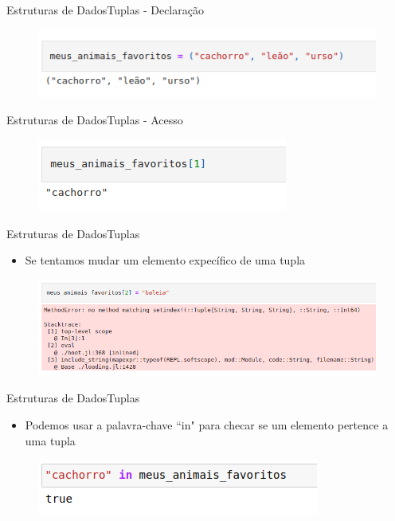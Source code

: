 \documentclass{beamer}
\begin{document}
\begin{frame}{Estruturas de Dados}{Tuplas - Declaração}
    \begin{figure}
        \centering
        \includegraphics[scale=0.5]{imagens/tuplas01.png}
        \label{fig:my_label}
    \end{figure}    
\end{frame}

\begin{frame}{Estruturas de Dados}{Tuplas - Acesso}
    \begin{figure}
        \centering
        \includegraphics[scale=0.5]{imagens/tuplas02.png}
        \label{fig:my_label}
    \end{figure}    
\end{frame}

\begin{frame}{Estruturas de Dados}{Tuplas}
    \begin{itemize}
        \item Se tentamos mudar um elemento expecífico de uma tupla
    \end{itemize}
    \begin{figure}
        \centering
        \includegraphics[scale=0.4]{imagens/tuplas03.png}
        \label{fig:my_label}
    \end{figure}
\end{frame}

\begin{frame}{Estruturas de Dados}{Tuplas}
    \begin{itemize}
        \item Podemos usar a palavra-chave ``in" para checar se um elemento pertence a uma tupla
    \end{itemize}
    \begin{figure}
        \centering
        \includegraphics[scale=0.5]{imagens/tuplas05.png}
        \label{fig:my_label}
    \end{figure}
\end{frame}
\end{document}
